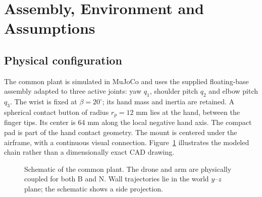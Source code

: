 \documentclass[conference]{IEEEtran}
\begin{document}
\section{Assembly, Environment and Assumptions}
\subsection{Physical configuration}
The common plant is simulated in MuJoCo \cite{mujoco} and uses the supplied floating-base assembly adapted to three active joints: yaw $q_1$, shoulder pitch $q_2$ and elbow pitch $q_3$. The wrist is fixed at $\beta=20^\circ$; its hand mass and inertia are retained. A spherical contact button of radius $r_p=12$ mm lies at the hand, between the finger tips. Its center is 64 mm along the local negative hand axis. The compact pad is part of the hand contact geometry. The mount is centered under the airframe, with a continuous visual connection. Figure~\ref{fig:geometry} illustrates the modeled chain rather than a dimensionally exact CAD drawing.

\begin{figure}[t]
\centering
{}
\caption{Schematic of the common plant. The drone and arm are physically coupled for both B and N. Wall trajectories lie in the world $y$--$z$ plane; the schematic shows a side projection.}
\label{fig:geometry}
\end{figure}
\end{document}
